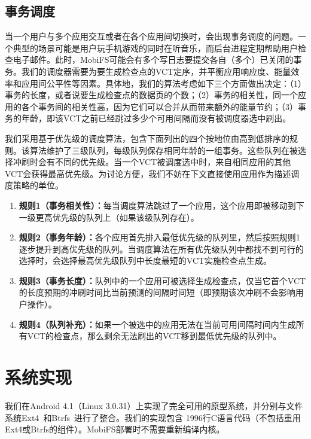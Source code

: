 \subsection{事务调度}
\label{vct:sched}

当一个用户与多个应用交互或者在各个应用间切换时，会出现事务调度的问题。一个典型的场景可能是用户玩手机游戏的同时在听音乐，而后台进程定期帮助用户检查电子邮件。此时，MobiFS可能会有多个写日志要提交各自（多个）已关闭的事务。我们的调度器需要为要生成检查点的VCT定序，并平衡应用响应度、能量效率和应用间公平性等因素。具体地，我们的算法考虑如下三个方面做出决定：（1）事务的长度，或者说要生成检查点的数据页的个数；（2）事务的相关性，同一个应用的各个事务间的相关性高，因为它们可以合并从而带来额外的能量节约；（3）事务的年龄，即该VCT之前已经跳过多少个可用间隔而没有被调度器选中刷出。 
 
我们采用基于优先级的调度算法，包含下面列出的四个按地位由高到低排序的规则。该算法维护了三级队列，每级队列保存相同年龄的一组事务。这些队列在被选择冲刷时会有不同的优先级。当一个VCT被调度选中时，来自相同应用的其他VCT会获得最高优先级。为讨论方便，我们不妨在下文直接使用应用作为描述调度策略的单位。

\begin{enumerate}
\item \textbf{规则1（事务相关性）：}每当调度算法跳过了一个应用，这个应用即被移动到下一级更高优先级的队列上（如果该级队列存在）。

\item \textbf{规则2（事务年龄）：}各个应用首先排入最低优先级的队列里，然后按照规则1逐步提升到高优先级的队列。当调度算法在所有优先级队列中都找不到可行的选择时，会选择最高优先级队列中长度最短的VCT实施检查点生成。

\item \textbf{规则3（事务长度）：}队列中的一个应用可被选择生成检查点，仅当它首个VCT的长度预期的冲刷时间比当前预测的间隔时间短（即预期该次冲刷不会影响用户操作）。

\item \textbf{规则4（队列补充）：}如果一个被选中的应用无法在当前可用间隔时间内生成所有VCT的检查点，那么剩余无法刷出的VCT移到最低优先级的队列中。

\end{enumerate}

\section{系统实现}

我们在Android 4.1（Linux 3.0.31）上实现了完全可用的原型系统，并分别与文件系统Ext4~\cite{Mathur:Ext4:2007}和Btrfs~\cite{Rodeh:2013:BLB:2501620.2501623}进行了整合。我们的实现包含
1996行C语言代码（不包括重用Ext4或Btrfs的组件）。MobiFS部署时不需要重新编译内核。

